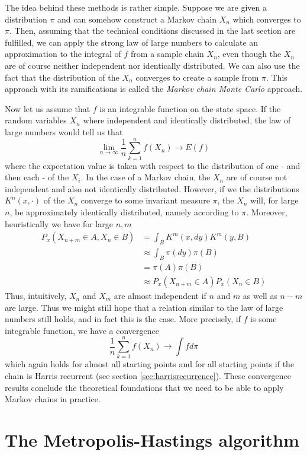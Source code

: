 \documentclass[a4paper, draft]{article}
\theoremstyle{own}
\theoremstyle{remark}
\begin{document}
The idea behind these methods is rather simple. Suppose we are given a distribution $\pi$ and can somehow construct a Markov chain $X_n$ which converges to $\pi$. Then, assuming that the technical conditions discussed in the last section are fulfilled, we can apply the strong law of large numbers to calculate an approximation to the integral of $f$ from a sample chain $X_n$, even though the $X_n$ are of course neither independent nor identically distributed. We can also use the fact that the distribution of the $X_n$ converges to create a sample from $\pi$. This approach with its ramifications is called the {\em Markov chain Monte Carlo} approach.

Now let us assume that $f$ is an integrable function on the state space. If the random variables $X_n$ where independent and identically distributed, the law of large numbers would tell us that 
$$
\lim_{n \rightarrow \infty} \frac{1}{n} \sum_{k=1}^n f(X_n) \rightarrow E(f)
$$
where the expectation value is taken with respect to the distribution of one - and then each - of the $X_i$. In the case of a Markov chain, the $X_n$ are of course not independent and also not identically distributed. However, if we the distributions $K^n(x,\cdot)$ of the $X_n$ converge to some invariant measure $\pi$, the $X_n$ will, for large $n$, be approximately identically distributed, namely according to $\pi$. Moreover, heuristically we have for large $n, m$
\begin{align*}
P_x(X_{n+m} \in A, X_n \in B) &= \int_B K^m(x,dy) K^m(y, B) \\
& \approx \int_B \pi(dy) \pi(B) \\
&= \pi(A) \pi(B) \\
&\approx P_x(X_{n+m} \in A) P_x(X_n \in B)
\end{align*}
Thus, intuitively, $X_n$ and $X_m$ are almost independent if $n$ and $m$ as well as $n-m$ are large. Thus we might still hope that a relation similar to the law of large numbers still holds, and in fact this is the case. More precisely, if $f$ is some integrable function, we have a convergence
$$
\frac{1}{n} \sum_{k=1}^n f(X_n) \rightarrow \int f d\pi
$$
which again holds for almost all starting points and for all starting points if the chain is Harris recurrent (see section \ref{sec:harrisrecurrence}). These convergence results conclude the theoretical foundations that we need to be able to apply Markov chains in practice.

\section{The Metropolis-Hastings algorithm}
\end{document}
